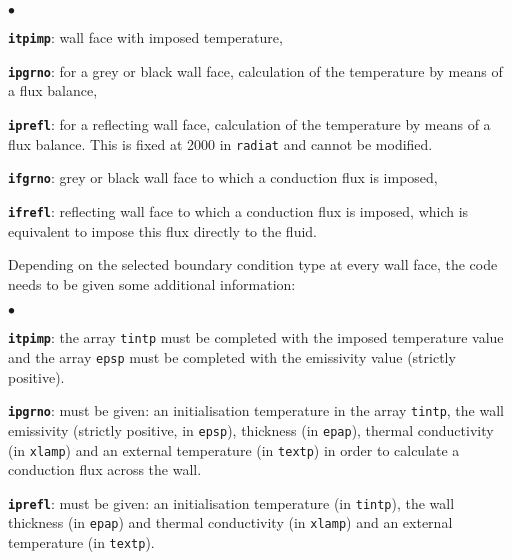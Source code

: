 {{{\begin{list}{$\bullet$}{}

\item \texttt{\textbf{itpimp}}: wall face with imposed temperature,

\item \texttt{\textbf{ipgrno}}: for a grey or black wall face, calculation of the
      temperature by means of a flux balance,

\item \texttt{\textbf{iprefl}}: for a reflecting wall face, calculation of the
      temperature by means of a flux balance.
 This is fixed at 2000 in \texttt{radiat} and cannot be modified.

\item \texttt{\textbf{ifgrno}}: grey or black wall face to which a conduction
      flux is imposed,

\item \texttt{\textbf{ifrefl}}: reflecting wall face to which a conduction
      flux is imposed, which is equivalent to impose this flux directly
      to the fluid.

\end{list}

\noindent
Depending on the selected boundary condition type at every wall face,
the code needs to be given some additional information:

\begin{list}{$\bullet$}{}

\item \texttt{\textbf{itpimp}}: the array \texttt{tintp} must be completed
      with the imposed temperature value and the array \texttt{epsp} must
      be completed with the emissivity value (strictly positive).

\item \texttt{\textbf{ipgrno}}: must be given: an initialisation temperature in
      the array \texttt{tintp}, the wall emissivity (strictly positive, in
      \texttt{epsp}), thickness (in \texttt{epap}), thermal conductivity
      (in \texttt{xlamp}) and an external temperature (in \texttt{textp})
      in order to calculate a conduction flux across the wall.

\item \texttt{\textbf{iprefl}}: must be given: an initialisation temperature (in
      \texttt{tintp}), the wall thickness (in \texttt{epap}) and thermal conductivity (in
      \texttt{xlamp}) and an external temperature (in \texttt{textp}).


\end{list}}}}
